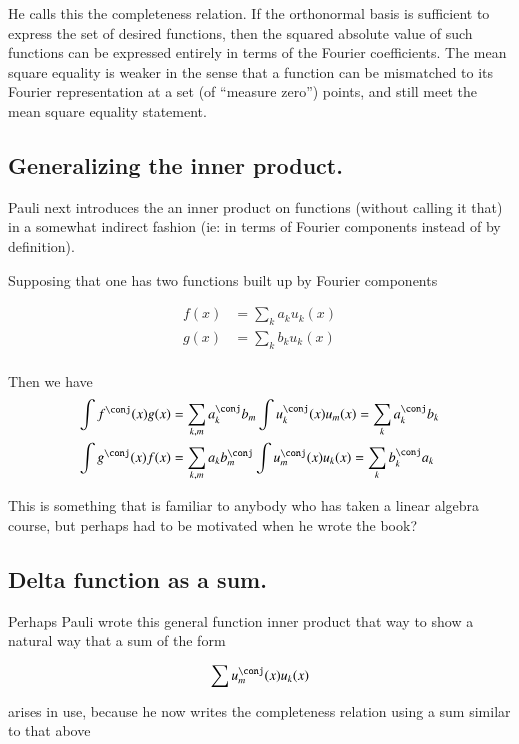 He calls this the completeness relation.  If the orthonormal basis is sufficient to express the set of desired functions, then
the squared absolute value of such functions can be expressed entirely in terms of the Fourier coefficients.  The mean square
equality is weaker in the sense that a function can be mismatched to its Fourier representation at a set (of ``measure zero'') points,
and still meet the mean square equality statement.

\subsection{Generalizing the inner product. }

Pauli next introduces the an inner product on functions (without calling it that) 
in a somewhat indirect
fashion (ie: in terms of Fourier components instead of by definition).

Supposing that one has two functions built up by Fourier components

\begin{align*}
f(x) &= \sum_k a_k u_k(x) \\
g(x) &= \sum_k b_k u_k(x) \\
\end{align*}

Then we have 
\begin{align*}
\int f^\conj(x) g(x) &= \sum_{k,m} a_k^\conj b_m \int u_k^\conj(x) u_m(x) = \sum_k a_k^\conj b_k \\
\int g^\conj(x) f(x) &= \sum_{k,m} a_k b_m^\conj \int u_m^\conj(x) u_k(x) = \sum_k b_k^\conj a_k \\
\end{align*}

This is something that is familiar to anybody who has taken a linear
algebra course, but perhaps had to be motivated when he wrote the book?

\subsection{Delta function as a sum. }

Perhaps Pauli wrote this general function inner product that way to show a natural way that a sum of the
form

\begin{align*}
\sum u_m^\conj(x) u_k(x)
\end{align*}

arises in use, because he now writes the completeness relation using a sum similar to that above

